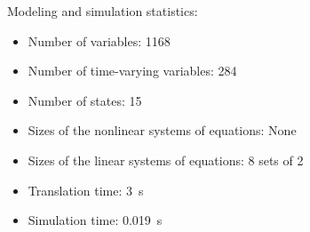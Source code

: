 \begin{contextbox}
  Modeling and simulation statistics:
  \begin{itemize}
    \item Number of variables: 1168
    \item Number of time-varying variables: 284
    \item Number of states: 15
    \item Sizes of the nonlinear systems of equations: None
    \item Sizes of the linear systems of equations: 8 sets of 2
    \item Translation time: \SI{3}{s}
    \item Simulation time: \SI{0.019}{s}
  \end{itemize}
\end{contextbox}